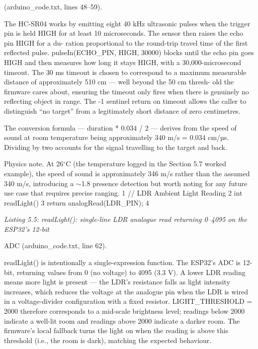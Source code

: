 (arduino\_code.txt, lines 48--59).


The HC-SR04 works by emitting eight 40 kHz ultrasonic pulses when the trigger pin is
held HIGH for at least 10 microseconds. The sensor then raises the echo pin HIGH for a du-
ration proportional to the round-trip travel time of the ﬁrst reﬂected pulse. pulseIn(ECHO\_PIN,
HIGH, 30000) blocks until the echo pin goes HIGH and then measures how long it stays
HIGH, with a 30,000-microsecond timeout. The 30 ms timeout is chosen to correspond to a
maximum measurable distance of approximately 510 cm --- well beyond the 50 cm thresh-
old the ﬁrmware cares about, ensuring the timeout only ﬁres when there is genuinely no
reﬂecting object in range. The -1 sentinel return on timeout allows the caller to distinguish
``no target'' from a legitimately short distance of zero centimetres.

The conversion formula --- duration * 0.034 / 2 --- derives from the speed of
sound at room temperature being approximately 340 m/s = 0.034 cm/µs. Dividing by two
accounts for the signal travelling to the target and back.


Physics note. At 26$^\circ$C (the temperature logged in the Section 5.7 worked example), the
speed of sound is approximately 346 m/s rather than the assumed 340 m/s, introducing a
$\sim$1.8%
presence detection but worth noting for any future use case that requires precise ranging.
1 // LDR Ambient Light Reading
2 int readLight() {
3 return analogRead(LDR\_PIN);
4 }


\textit{Listing 5.5: readLight(): single-line LDR analogue read returning 0--4095 on the ESP32's 12-bit}

ADC (arduino\_code.txt, line 62).



readLight() is intentionally a single-expression function. The ESP32's ADC is 12-
bit, returning values from 0 (no voltage) to 4095 (3.3 V). A lower LDR reading means more
light is present --- the LDR's resistance falls as light intensity increases, which reduces the
voltage at the analogue pin when the LDR is wired in a voltage-divider conﬁguration with a
ﬁxed resistor. LIGHT\_THRESHOLD = 2000 therefore corresponds to a mid-scale brightness
level; readings below 2000 indicate a well-lit room and readings above 2000 indicate a
darker room. The ﬁrmware's local fallback turns the light on when the reading is above this
threshold (i.e., the room is dark), matching the expected behaviour.

